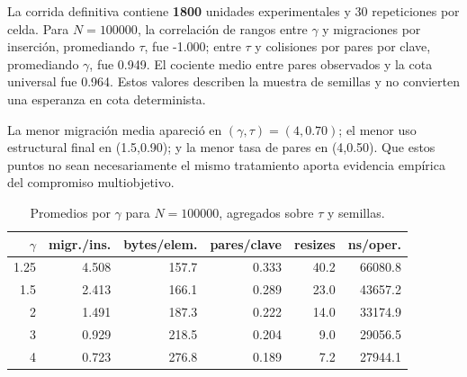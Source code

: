 La corrida definitiva contiene \textbf{1800} unidades experimentales y
30 repeticiones por celda. Para $N=100000$, la
correlación de rangos entre $\gamma$ y migraciones por inserción, promediando
$\tau$, fue -1.000; entre $\tau$ y colisiones por pares por clave,
promediando $\gamma$, fue 0.949. El cociente medio entre pares
observados y la cota universal fue 0.964. Estos valores describen
la muestra de semillas y no convierten una esperanza en cota determinista.

La menor migración media apareció en $(\gamma,\tau)=(4,
0.70)$; el menor uso estructural final en
(1.5,0.90); y la menor tasa de pares en
(4,0.50). Que estos puntos no
sean necesariamente el mismo tratamiento aporta evidencia empírica del
compromiso multiobjetivo.

\begin{table}[ht]
\centering\small
\caption{Promedios por $\gamma$ para $N=100000$, agregados sobre $\tau$ y semillas.}
\begin{tabular}{rrrrrr}
\toprule
$\gamma$ & migr./ins. & bytes/elem. & pares/clave & resizes & ns/oper. \\
\midrule
1.25 & 4.508 & 157.7 & 0.333 & 40.2 & 66080.8 \\
1.5 & 2.413 & 166.1 & 0.289 & 23.0 & 43657.2 \\
2 & 1.491 & 187.3 & 0.222 & 14.0 & 33174.9 \\
3 & 0.929 & 218.5 & 0.204 & 9.0 & 29056.5 \\
4 & 0.723 & 276.8 & 0.189 & 7.2 & 27944.1 \\
\bottomrule
\end{tabular}
\end{table}
